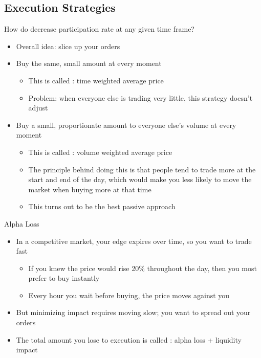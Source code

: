 \subsection{Execution Strategies}
How do decrease participation rate at any given time frame?
\begin{itemize}
    \item Overall idea: slice up your orders
    \item Buy the same, small amount at every moment
        \begin{itemize}
            \item This is called : time weighted average price 
            \item Problem: when everyone else is trading very little, this strategy doesn't adjust
        \end{itemize}
    \item Buy a small, proportionate amount to everyone else's volume at every moment
        \begin{itemize}
            \item This is called : volume weighted average price
            \item The principle behind doing this is that people tend to trade more at the start and end of the day, which would make you less likely to move the market when buying more at that time
            \item This turns out to be the best passive approach
        \end{itemize}
\end{itemize}

Alpha Loss
\begin{itemize}
    \item In a competitive market, your edge expires over time, so you want to trade fast
        \begin{itemize}
            \item If you knew the price would rise 20\% throughout the day, then you most prefer to buy instantly
            \item Every hour you wait before buying, the price moves against you
        \end{itemize}

    \item But minimizing impact requires moving slow; you want to spread out your orders
    \item The total amount you lose to execution is called : alpha loss + liquidity impact
\end{itemize}


